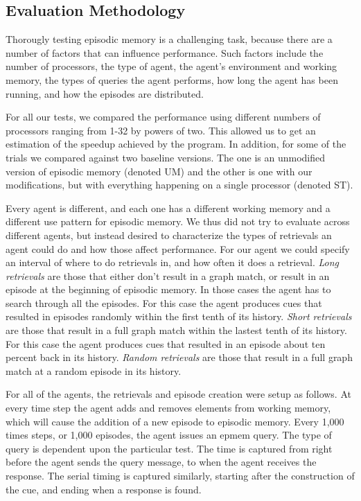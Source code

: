 \documentclass[11pt]{article} %
\begin{document}
\subsection{Evaluation Methodology}
Thorougly testing episodic memory is a challenging task, because there are a number
of factors that can influence performance. Such factors include the number of processors,
the type of agent, the agent's environment and working memory,  the types of queries the agent performs,
 how long the agent has been running, and how the episodes are distributed. 

For all our tests, we compared the performance using different numbers of processors
ranging from 1-32 by powers of two. This allowed us to get an estimation of the speedup
achieved by the program. In addition, for some of the trials we compared against two 
baseline versions. The one is an unmodified version of episodic memory (denoted UM) and
the other is one with our modifications, but with everything happening on a single processor 
(denoted ST). 

Every agent is different, and each one has a different working memory and a different
use pattern for episodic memory. We thus did not try to evaluate across different agents, 
but instead desired to characterize the types of retrievals an agent could do and how those
affect performance. For our agent we could specify an interval of where to do retrievals 
in, and how often it does a retrieval. 
\emph{Long retrievals} are those that either don't result in a graph match, or 
result in an episode at the beginning of episodic memory. In those cases the agent has to 
search through all the episodes. For this case the agent produces cues that resulted
in episodes randomly within the first tenth of its history. \emph{Short retrievals} are those
that result in a full graph match within the lastest tenth of its history. For this case the agent produces 
cues that resulted in an episode about ten percent back in its history. \emph{Random retrievals} are
those that result in a full graph match at a random episode in its history. 

For all of the agents, the retrievals and episode creation were setup as
follows. At every time step the agent adds and removes elements from working
memory, which will cause the addition of a new episode to episodic memory. Every
1,000 times steps, or 1,000 episodes, the agent issues an epmem query. The type of
query is dependent upon the particular test. The time is captured from right before the agent sends the query
message, to when the agent receives the response. The serial timing is captured
similarly, starting after the construction of the cue, and ending when a
response is found.
\end{document}
